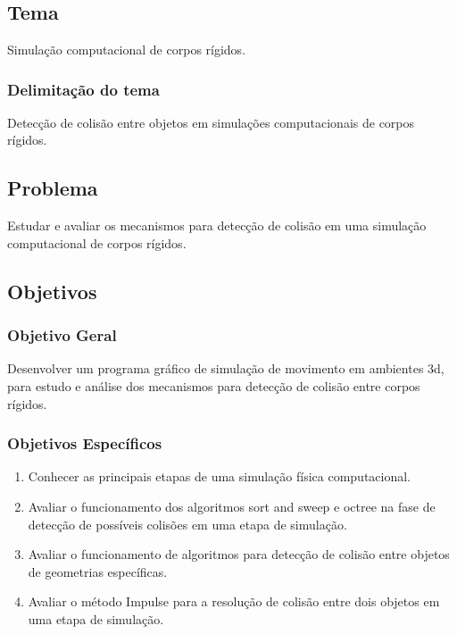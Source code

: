 \chapter*[]{}

\section{Tema}

Simulação computacional de corpos rígidos.

\subsection{Delimitação do tema}

Detecção de colisão entre objetos em simulações computacionais de corpos rígidos.

\section{Problema}

 Estudar e avaliar os mecanismos para detecção de colisão em uma simulação computacional de corpos rígidos.


\section{Objetivos}
\subsection{Objetivo Geral}
Desenvolver um programa gráfico de simulação de movimento em ambientes 3d, para estudo e análise dos mecanismos para detecção de colisão entre corpos rígidos.

\subsection{Objetivos Específicos}
\begin{enumerate}
\item Conhecer as principais etapas de uma simulação física computacional.
\item Avaliar o funcionamento dos algoritmos sort and sweep e octree na fase de detecção de possíveis colisões em uma etapa de simulação.
\item Avaliar o funcionamento de algoritmos para detecção de colisão entre objetos de geometrias específicas.
\item Avaliar o método Impulse para a resolução de colisão entre dois objetos em uma etapa de simulação.
\end{enumerate}

